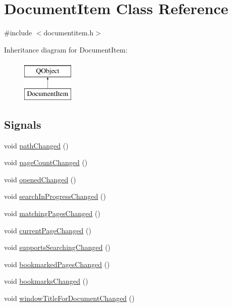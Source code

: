 \hypertarget{classDocumentItem}{\section{Document\+Item Class Reference}
\label{classDocumentItem}
}


{\ttfamily \#include $<$documentitem.\+h$>$}

Inheritance diagram for Document\+Item\+:\begin{figure}[H]
\begin{center}
\leavevmode
\includegraphics[height=2.000000cm]{classDocumentItem}
\end{center}
\end{figure}
\subsection*{Signals}
\begin{DoxyCompactItemize}
\item 
void \hyperlink{classDocumentItem_af2813f6fa5e8bb6cdee5df08f15e5f73}{path\+Changed} ()
\item 
void \hyperlink{classDocumentItem_a3b5a91c64134447c0e9c628d26ad2968}{page\+Count\+Changed} ()
\item 
void \hyperlink{classDocumentItem_a93e395b8ea99c16387763ef694cfb673}{opened\+Changed} ()
\item 
void \hyperlink{classDocumentItem_a96cce0af8947ce4905fa2fba432e4a86}{search\+In\+Progress\+Changed} ()
\item 
void \hyperlink{classDocumentItem_a63ca2488654c5dcd44faa0e9cb7f1593}{matching\+Pages\+Changed} ()
\item 
void \hyperlink{classDocumentItem_a7bc66350bdf55e52a4964a321a3da336}{current\+Page\+Changed} ()
\item 
void \hyperlink{classDocumentItem_aae46fa6ed5a3979fb0fb513c26cd615d}{supports\+Searching\+Changed} ()
\item 
void \hyperlink{classDocumentItem_a070d363a2fc7c35ba03eb30d1c43ff86}{bookmarked\+Pages\+Changed} ()
\item 
void \hyperlink{classDocumentItem_aed1dbcd6f792d073a0cb1997057eebf5}{bookmarks\+Changed} ()
\item 
void \hyperlink{classDocumentItem_a15dcdab66d2006d40291efb969c171e0}{window\+Title\+For\+Document\+Changed} ()
\end{DoxyCompactItemize}
